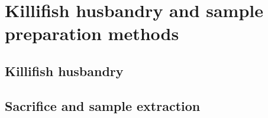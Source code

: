 \section{Killifish husbandry and sample preparation methods}

\subsection{Killifish husbandry}

\subsection{Sacrifice and sample extraction}